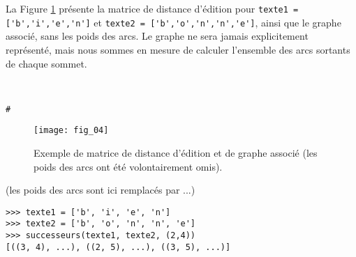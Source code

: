 La Figure \ref{fig:04} présente la matrice de distance d'édition pour \lstinline{texte1 = ['b','i','e','n']}
et \lstinline{texte2 = ['b','o','n','n','e']}, ainsi que le graphe associé, sans les poids des arcs.
Le graphe ne sera jamais explicitement représenté, mais nous sommes en mesure de calculer
l'ensemble des arcs sortants de chaque sommet.

\ifprof
\begin{corrige}~\\ 
\vspace{-.5cm}
\begin{lstlisting}
#
\end{lstlisting}
\end{corrige}
\else
\fi


\begin{figure}[H]
\centering
\texttt{[image: fig\_04]}
\caption{Exemple de matrice de distance d'édition et de graphe associé (les poids des arcs
ont été volontairement omis). \label{fig:04}}
\end{figure}


\begin{exemple}(les poids des arcs sont ici remplacés par ...)
\begin{lstlisting}
>>> texte1 = ['b', 'i', 'e', 'n']
>>> texte2 = ['b', 'o', 'n', 'n', 'e']
>>> successeurs(texte1, texte2, (2,4))
[((3, 4), ...), ((2, 5), ...), ((3, 5), ...)]
\end{lstlisting}
\end{exemple}

